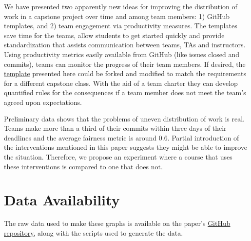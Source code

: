 \documentclass[10pt, conference]{IEEEtran}
\begin{document}
We have presented two apparently new ideas for improving the distribution of
work in a capstone project over time and among team members: 1) GitHub
templates, and 2) team engagement via productivity measures. The templates save
time for the teams, allow students to get started quickly and provide
standardization that assists communication between teams, TAs and instructors.
Using productivity metrics easily available from GitHub (like issues closed and
commits), teams can monitor the progress of their team members.  If desired, the
\href{REDACTED} {template} presented here could be forked and modified to match
the requirements for a different capstone class.  With the aid of a team charter
they can develop quantified rules for the consequences if a team member does not
meet the team's agreed upon expectations.

Preliminary data shows that the problems of uneven distribution of work is real.
Teams make more than a third of their commits within three days of their
deadlines and the average fairness metric is around 0.6. Partial introduction of
the interventions mentioned in this paper suggests they might be able to improve
the situation.  Therefore, we propose an experiment where a course that uses
these interventions is compared to one that does not.

\section{Data Availability}
The raw data used to make these graphs is available on the paper's 
\href{REDACTED Link}{GitHub repository}, along with the scripts used to generate
the data.



\end{document}
